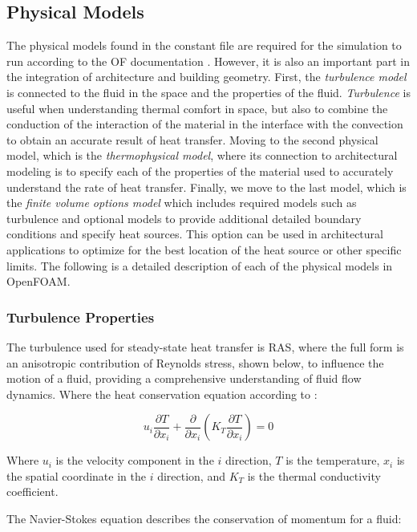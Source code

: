 \subsection{Physical Models}
The physical models found in the constant file are required for the simulation to run according to the \gls{OF} documentation \cite{OFD}. However, it is also an important part in the integration of architecture and building geometry. First, the \textit{turbulence model} is connected to the fluid in the space and the properties of the fluid. \textit{Turbulence} is useful when understanding thermal comfort in space, but also to combine the conduction of the interaction of the material in the interface with the convection to obtain an accurate result of heat transfer. Moving to the second physical model, which is the \textit{ thermophysical model}, where its connection to architectural modeling is to specify each of the properties of the material used to accurately understand the rate of heat transfer. Finally, we move to the last model, which is the \textit{finite volume options model} which includes required models such as turbulence and optional models to provide additional detailed boundary conditions and specify heat sources. 
This option can be used in architectural applications to optimize for the best location of the heat source or other specific limits. The following is a detailed description of each of the physical models in OpenFOAM.


\subsubsection{Turbulence Properties}
The turbulence used for steady-state heat transfer is \gls{RAS}, where the full form is an anisotropic contribution of Reynolds stress, shown below, to influence the motion of a fluid, providing a comprehensive understanding of fluid flow dynamics. Where the heat conservation equation according to \cite{hce}:

\begin{equation}
u_i \frac{\partial T}{\partial x_i} + \frac{\partial}{\partial x_i}(K_T \frac{\partial T}{\partial x_i}) = 0 \label{eq:heat}
\end{equation}

Where \(u_i\) is the velocity component in the \(i\) direction, \(T\) is the temperature, \(x_i\) is the spatial coordinate in the \(i\) direction, and \(K_T\) is the thermal conductivity coefficient.

The Navier-Stokes equation describes the conservation of momentum for a fluid:

